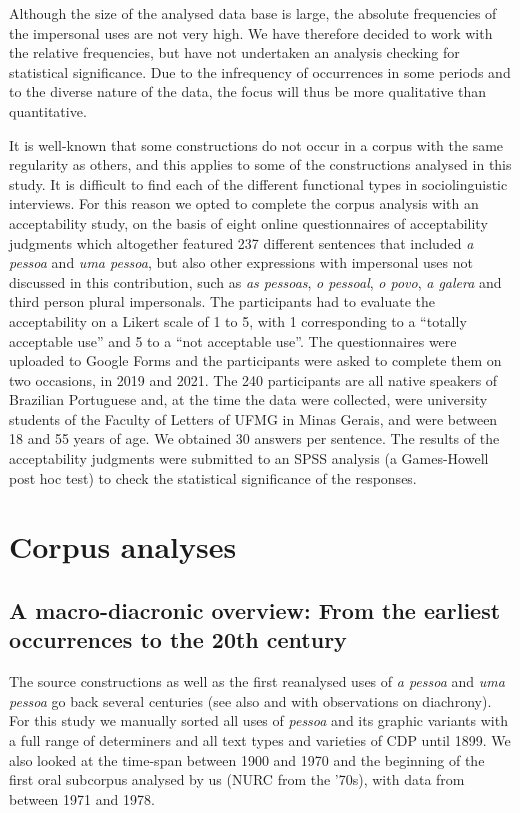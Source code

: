 \documentclass[output=paper]{langscibook}
\begin{document}
Although the size of the analysed data base is large, the absolute frequencies of the impersonal uses are not very high. We have therefore decided to work with the relative frequencies, but have not undertaken an analysis checking for statistical significance. Due to the infrequency of occurrences in some periods and to the diverse nature of the data, the focus will thus be more qualitative than quantitative.



{It is well-known that some constructions do not occur in a corpus with the same regularity as others, and this applies to some of the constructions analysed in this study. It is difficult to find each of the different functional types in sociolinguistic interviews. For this reason we opted to complete the corpus analysis with an acceptability study, on the basis of eight online questionnaires of acceptability judgments which altogether featured 237 different sentences that included} {\textit{a pessoa}} {and} {\textit{uma pessoa}}{, but also other expressions with impersonal uses not discussed in this contribution, such as} {\textit{as pessoas}}, {\textit{o pessoal}}, {\textit{o povo}}, {\textit{a galera}} {and third person plural impersonals. The participants had to evaluate the acceptability on a Likert scale of 1 to 5, with 1 corresponding to a “totally acceptable use” and 5 to a “not acceptable use”. The questionnaires were uploaded to Google Forms and the participants were asked to complete them on two occasions, in 2019 and 2021. The 240 participants are all native speakers of Brazilian Portuguese and, at the time the data were collected, were university students of the Faculty of Letters of UFMG in Minas Gerais, and were between 18 and 55 years of} {age. We obtained 30 answers per sentence. The results of the acceptability judgments were submitted to an SPSS analysis (a Games-Howell post hoc test) to check the statistical significance of the responses.}



\section{Corpus analyses}\label{sec:amaral:5}
\subsection{A macro-diacronic overview: From the earliest occurrences to the 20th century}\label{sec:amaral:5.1}

{The source constructions as well as the first reanalysed uses of} {\textit{a pessoa}} {and} {\textit{uma pessoa}} {go back several centuries (see also \citealt{Martins2022} and \citealt{Posio2021} with observations on diachrony). For this study we manually sorted all uses of} {\textit{pessoa} }{and its graphic variants with a full range of determiners and all text types and varieties of CDP until 1899. We also looked at the time-span between 1900 and 1970 and the beginning of the first oral subcorpus analysed by us (NURC from the ’70s), with data from between 1971 and 1978.}
\end{document}
